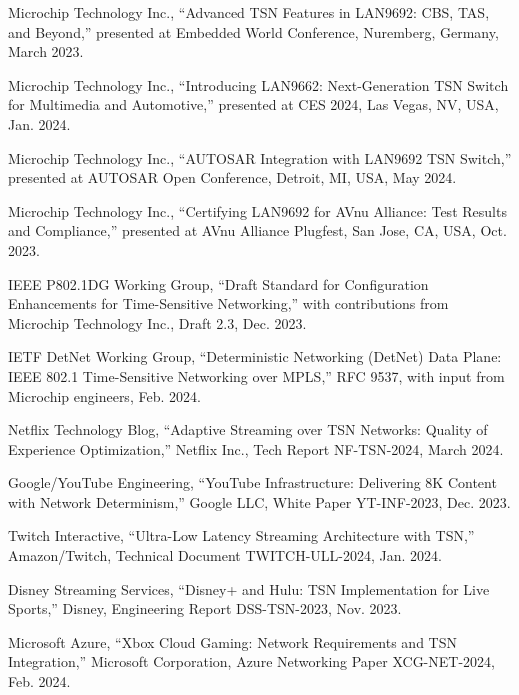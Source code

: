 \documentclass[10pt, journal, compsoc]{IEEEtran}
\begin{document}
\begin{thebibliography}{99}
Microchip Technology Inc., ``Advanced TSN Features in LAN9692: CBS, TAS, and Beyond,'' presented at Embedded World Conference, Nuremberg, Germany, March 2023.

Microchip Technology Inc., ``Introducing LAN9662: Next-Generation TSN Switch for Multimedia and Automotive,'' presented at CES 2024, Las Vegas, NV, USA, Jan. 2024.

Microchip Technology Inc., ``AUTOSAR Integration with LAN9692 TSN Switch,'' presented at AUTOSAR Open Conference, Detroit, MI, USA, May 2024.

Microchip Technology Inc., ``Certifying LAN9692 for AVnu Alliance: Test Results and Compliance,'' presented at AVnu Alliance Plugfest, San Jose, CA, USA, Oct. 2023.

IEEE P802.1DG Working Group, ``Draft Standard for Configuration Enhancements for Time-Sensitive Networking,'' with contributions from Microchip Technology Inc., Draft 2.3, Dec. 2023.

IETF DetNet Working Group, ``Deterministic Networking (DetNet) Data Plane: IEEE 802.1 Time-Sensitive Networking over MPLS,'' RFC 9537, with input from Microchip engineers, Feb. 2024.

Netflix Technology Blog, ``Adaptive Streaming over TSN Networks: Quality of Experience Optimization,'' Netflix Inc., Tech Report NF-TSN-2024, March 2024.

Google/YouTube Engineering, ``YouTube Infrastructure: Delivering 8K Content with Network Determinism,'' Google LLC, White Paper YT-INF-2023, Dec. 2023.

Twitch Interactive, ``Ultra-Low Latency Streaming Architecture with TSN,'' Amazon/Twitch, Technical Document TWITCH-ULL-2024, Jan. 2024.

Disney Streaming Services, ``Disney+ and Hulu: TSN Implementation for Live Sports,'' Disney, Engineering Report DSS-TSN-2023, Nov. 2023.

Microsoft Azure, ``Xbox Cloud Gaming: Network Requirements and TSN Integration,'' Microsoft Corporation, Azure Networking Paper XCG-NET-2024, Feb. 2024.


\end{thebibliography}
\end{document}

